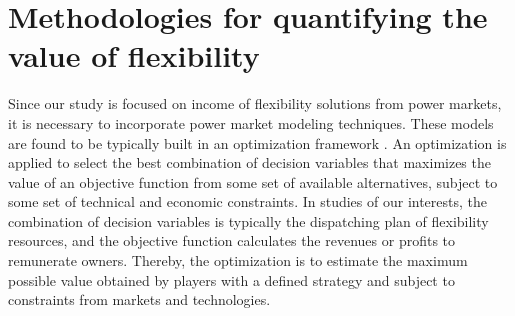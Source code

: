 








\section[Methodologies for quantifying the value of flexibility]{Methodologies for quantifying the value of flexibility%
	}
Since our study is focused on income of flexibility solutions from power markets, it is necessary to incorporate power market modeling techniques. These models are found to be typically built in an optimization framework \cite{Zucker2013,GRUNEWALD2012449,VENTOSA2005897}. An optimization is applied to select the best combination of decision variables that maximizes the value of an objective function from some set of available alternatives, subject to some set of technical and economic constraints. In studies of our interests, the combination of decision variables is typically the dispatching plan of flexibility resources, and the objective function calculates the revenues or profits to remunerate owners. Thereby, the optimization is to estimate the maximum possible value obtained by players with a defined strategy and subject to constraints from markets and technologies. 

